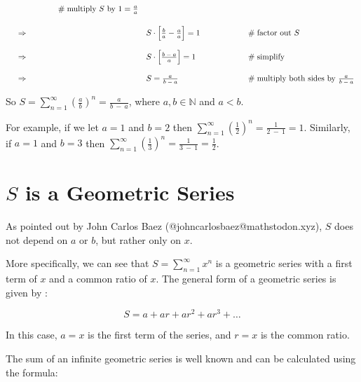 \documentclass{article}
\theoremstyle{definition}
\begin{document}
\begin{equation*}
\begin{array}{lllll}
                &\hspace{5em}  \mathrel{\#} \text{multiply $S$ by $1 = \frac{a}{a}$} \\
[15pt]
&\Rightarrow&  S \cdot \left [\frac{b}{a}  - \frac{a}{a} \right ] = 1
                &\hspace{5em}  \mathrel{\#} \text{factor out $S$} \\
[15pt]
&\Rightarrow& S \cdot \left [ \frac{b \:-\: a} {a} \right ] = 1
                &\hspace{5em}  \mathrel{\#} \text{simplify} \\ 
[15pt] 
&\Rightarrow& S  = \frac{a}{b \:-\: a}
                &\hspace{5em}  \mathrel{\#} \text{multiply both sides
                 by $ \frac{a}{b \:-\: a} $} 
\end{array}
\end{equation*}

\bigskip
\noindent
So $S = \sum\limits_{n = 1}^\infty {\left (\frac{a}{b} \right
)}^n = \frac{a}{b \:-\: a}$, where $a,b \in \mathbb{N}$ and $a <
b$.

\bigskip
\noindent
For example, if we let $a =1$ and $b =2$ then $\sum\limits_{n =
1}^\infty {\left (\frac{1}{2} \right )}^n = \frac{1}{2 \:-\: 1} =
1$. Similarly, if $a =1$ and $b = 3$ then $\sum\limits_{n =
1}^\infty {\left (\frac{1}{3} \right )}^n = \frac{1}{3 \:-\: 1} =
\frac{1}{2}$.


\section{$S$ is a Geometric Series}
As pointed out by John Carlos Baez
(@johncarlosbaez@mathstodon.xyz), $S$ does not depend on $a$ or
$b$, but rather only on $x$.

\bigskip
\noindent
More specifically, we can see that $S = \sum\limits_{n=1}^{\infty} x^n$
is a geometric series with a first term of $x$ and a 
common ratio of $x$. The general form of a geometric series is given by
\cite{wiki:geometric_series}:

\begin{equation*}
S = a + ar + ar^2 + ar^3 + \ldots 
\end{equation*}

\medskip
\noindent
In this case, $a = x$ is the first term of the series, and $r =
x$ is the common ratio.

\bigskip
\noindent
The sum of an infinite geometric series is well known and can be
calculated using the formula:
\end{document}

